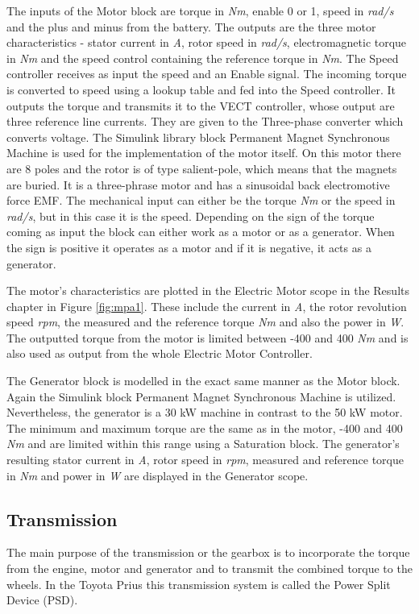 The inputs of the Motor block are torque in \textit{Nm}, enable 0 or 1, speed in \textit{rad/s} and the plus and minus from the battery. The outputs are the three motor characteristics - stator current in \textit{A}, rotor speed in \textit{rad/s}, electromagnetic torque in \textit{Nm} and the speed control containing the reference torque in \textit{Nm}. The Speed controller receives as input the speed and an Enable signal. The incoming torque is converted to speed using a lookup table and fed into the Speed controller. It outputs the torque and transmits it to the VECT controller, whose output are three reference line currents. They are given to the Three-phase converter which converts voltage. The Simulink library block Permanent Magnet Synchronous Machine \citep{pmsmMatlab} is used for the implementation of the motor itself. On this motor there are 8 poles and the rotor is of type salient-pole, which means that the magnets are buried. It is a three-phrase motor and has a sinusoidal back electromotive force EMF. The mechanical input can either be the torque \textit{Nm} or the speed in \textit{rad/s}, but in this case it is the speed. Depending on the sign of the torque coming as input the block can either work as a motor or as a generator. When the sign is positive it operates as a motor and if it is negative, it acts as a generator. 

The motor's characteristics are plotted in the Electric Motor scope in the Results chapter in Figure \ref{fig:mpa1}. These include the current in \textit{A}, the rotor revolution speed \textit{rpm}, the measured and the reference torque \textit{Nm} and also the power in \textit{W}. The outputted torque from the motor is limited between -400 and 400 \textit{Nm} and is also used as output from the whole Electric Motor Controller.

The Generator block is modelled in the exact same manner as the Motor block. Again the Simulink block Permanent Magnet Synchronous Machine \citep{pmsmMatlab} is utilized. Nevertheless, the generator is a 30 kW machine in contrast to the 50 kW motor. The minimum and maximum torque are the same as in the motor, -400 and 400 \textit{Nm} and are limited within this range using a Saturation block. The generator's resulting stator current in \textit{A}, rotor speed in \textit{rpm}, measured and reference torque in \textit{Nm} and power in \textit{W} are displayed in the Generator scope.

\subsection{Transmission}
The main purpose of the transmission or the gearbox is to incorporate the torque from the engine, motor and generator and to transmit the combined torque to the wheels. In the Toyota Prius this transmission system is called the Power Split Device (PSD). 

